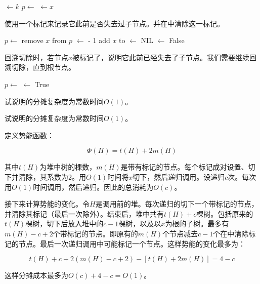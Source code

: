 \documentclass[b5paper]{ctexart}
\begin{document}
\begin{algorithmic}[1]
  \State {} $\gets k$
  \State $p \gets $ 
    \State {}
    \State {} 
  \EndIf
    \State {} $\gets x$
  \EndIf
\EndFunction
\end{algorithmic}

使用一个标记来记录它此前是否失去过子节点。并在中清除这一标记。

\begin{algorithmic}[1]
  \State $p \gets $ 
  \State remove $x$ from $p$
  \State {} $\gets$  - 1
  \State add $x$ to 
  \State {} $\gets$ NIL
  \State {} $\gets$ False
\EndFunction
\end{algorithmic}

回溯切除时，若节点$x$被标记了，说明它此前已经失去了子节点。我们需要继续回溯切除，直到根节点。

\begin{algorithmic}[1]
  \State $p \gets $ 
      \State {} $\gets$ True
    \Else
      \State {}
      \State {}
    \EndIf
  \EndIf
\EndFunction
\end{algorithmic}

\begin{Exercise}\label{ex:fibo-heap-decrease}
试说明的分摊复杂度为常数时间$O(1)$。
\end{Exercise}

\begin{Answer}[ref = {ex:fibo-heap-decrease}]
试说明的分摊复杂度为常数时间$O(1)$。

定义势能函数：

\[
\Phi(H) = t(H) + 2m(H)
\]

其中$t(H)$为堆中树的棵数，$m(H)$是带有标记的节点。每个标记成对设置、切下并清除，其系数为2。用$O(1)$时间将$x$切下，然后递归调用。设递归$c$次。每次用$O(1)$时间调用，然后递归。因此的总消耗为$O(c)$。

接下来计算势能的变化。令$H$是调用前的堆。每次递归的切下一个带标记的节点，并清除其标记（最后一次除外）。结束后，堆中共有$t(H) + c$棵树。包括原来的$t(H)$棵树，切下后放入堆中的$c-1$棵树，以及以$x$为根的子树。最多有$m(H) - c + 2$个带标记的节点。即原有的$m(H)$个节点减去$c -1$个在中清除标记的节点。最后一次递归调用中可能标记一个节点。这样势能的变化最多为：

\[
t(H) + c + 2(m(H) - c + 2) - [t(H) + 2m(H)] = 4 - c
\]

这样分摊成本最多为$O(c) + 4 - c = O(1)$。
\end{Answer}
\end{document}
